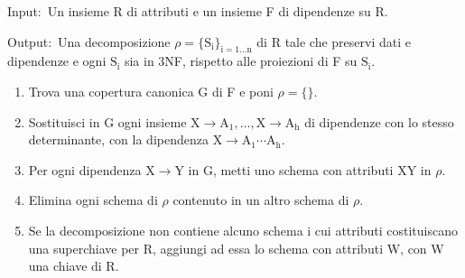 \begin{flushleft}
	Input:\ Un insieme R di attributi e un insieme F di dipendenze su R.\

	Output:\ Una decomposizione $\rho = \mathrm{\{S_i\}_{i=1\dots n}}$ di R tale che preservi dati e dipendenze e ogni $\mathrm{S_i}$ sia in 3NF, rispetto alle proiezioni di F su $\mathrm{S_i}$.\
\end{flushleft}

\begin{enumerate}
	\item Trova una copertura canonica G di F e poni $\rho = \{ \}$.
	\item Sostituisci in G ogni insieme $\mathrm{ X \rightarrow A_1, \dots, X \rightarrow A_h}$ di dipendenze con lo stesso determinante, con la dipendenza $ \mathrm{X \rightarrow A_1 \cdots A_h}$.
	\item Per ogni dipendenza $ \mathrm{X \rightarrow Y}$ in G, metti uno schema con attributi XY in $\rho$.
	\item Elimina ogni schema di $\rho$ contenuto in un altro schema di $\rho$.
	\item Se la decomposizione non contiene alcuno schema i cui attributi costituiscano una superchiave per R, aggiungi ad essa lo schema con attributi W, con W una chiave di R.
\end{enumerate}
